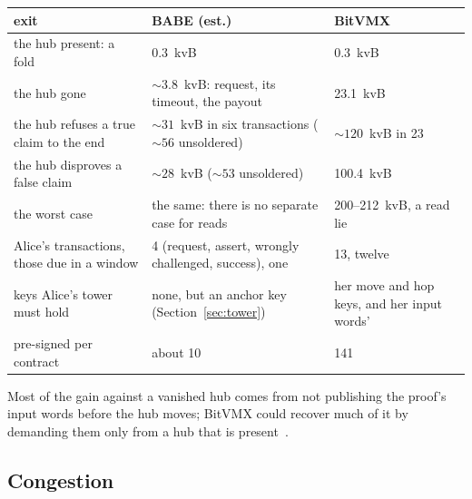 \documentclass[11pt]{article}
\begin{document}
\begin{center}
\small
\begin{tabularx}{\linewidth}{>{\raggedright\arraybackslash}p{56mm}LL}
\toprule
exit & BABE (est.) & BitVMX~\cite{lichenbitvmx} \\
\midrule
the hub present: a fold & 0.3~kvB & 0.3~kvB \\
the hub gone & ${\sim}3.8$~kvB: request, its timeout, the payout & 23.1~kvB \\
the hub refuses a true claim to the end & ${\sim}31$~kvB in six transactions (${\sim}56$ unsoldered) & ${\sim}120$~kvB in 23 \\
the hub disproves a false claim & ${\sim}28$~kvB (${\sim}53$ unsoldered) & 100.4~kvB \\
the worst case & the same: there is no separate case for reads & 200--212~kvB, a read lie \\
Alice's transactions, those due in a window & 4 (request, assert, wrongly challenged, success), one & 13, twelve \\
keys Alice's tower must hold & none, but an anchor key (Section~\ref{sec:tower}) & her move and hop keys, and her input words' \\
pre-signed per contract & about 10 & 141 \\
\bottomrule
\end{tabularx}
\end{center}
Most of the gain against a vanished hub comes from not publishing the
proof's input words before the hub moves; BitVMX could recover much of
it by demanding them only from a hub that is present~\cite{lichenbitvmx}.

\subsection{Congestion}
\end{document}
